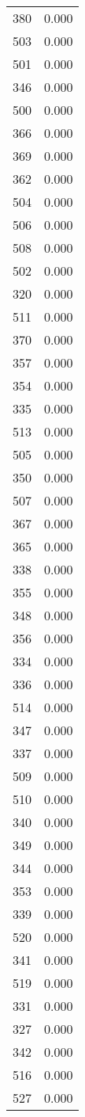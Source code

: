 \begin{table}
\begin{tabular}{lr}
380 & 0.000 \\
503 & 0.000 \\
501 & 0.000 \\
346 & 0.000 \\
500 & 0.000 \\
366 & 0.000 \\
369 & 0.000 \\
362 & 0.000 \\
504 & 0.000 \\
506 & 0.000 \\
508 & 0.000 \\
502 & 0.000 \\
320 & 0.000 \\
511 & 0.000 \\
370 & 0.000 \\
357 & 0.000 \\
354 & 0.000 \\
335 & 0.000 \\
513 & 0.000 \\
505 & 0.000 \\
350 & 0.000 \\
507 & 0.000 \\
367 & 0.000 \\
365 & 0.000 \\
338 & 0.000 \\
355 & 0.000 \\
348 & 0.000 \\
356 & 0.000 \\
334 & 0.000 \\
336 & 0.000 \\
514 & 0.000 \\
347 & 0.000 \\
337 & 0.000 \\
509 & 0.000 \\
510 & 0.000 \\
340 & 0.000 \\
349 & 0.000 \\
344 & 0.000 \\
353 & 0.000 \\
339 & 0.000 \\
520 & 0.000 \\
341 & 0.000 \\
519 & 0.000 \\
331 & 0.000 \\
327 & 0.000 \\
342 & 0.000 \\
516 & 0.000 \\
527 & 0.000 \\

\end{tabular}
\end{table}
